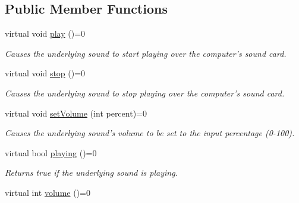 \subsection*{Public Member Functions}
\begin{DoxyCompactItemize}
\item 
\hypertarget{class_picto_1_1_preloaded_sound_a22fb576f20b369d32f1c6b42d7d00f79}{virtual void \hyperlink{class_picto_1_1_preloaded_sound_a22fb576f20b369d32f1c6b42d7d00f79}{play} ()=0}\label{class_picto_1_1_preloaded_sound_a22fb576f20b369d32f1c6b42d7d00f79}

\begin{DoxyCompactList}\small\item\em Causes the underlying sound to start playing over the computer's sound card. \end{DoxyCompactList}\item 
\hypertarget{class_picto_1_1_preloaded_sound_a876b9dd3eb966656503493a59e80554f}{virtual void \hyperlink{class_picto_1_1_preloaded_sound_a876b9dd3eb966656503493a59e80554f}{stop} ()=0}\label{class_picto_1_1_preloaded_sound_a876b9dd3eb966656503493a59e80554f}

\begin{DoxyCompactList}\small\item\em Causes the underlying sound to stop playing over the computer's sound card. \end{DoxyCompactList}\item 
\hypertarget{class_picto_1_1_preloaded_sound_abd5f14d441d6063b1ea2bd141e4023bc}{virtual void \hyperlink{class_picto_1_1_preloaded_sound_abd5f14d441d6063b1ea2bd141e4023bc}{set\-Volume} (int percent)=0}\label{class_picto_1_1_preloaded_sound_abd5f14d441d6063b1ea2bd141e4023bc}

\begin{DoxyCompactList}\small\item\em Causes the underlying sound's volume to be set to the input percentage (0-\/100). \end{DoxyCompactList}\item 
\hypertarget{class_picto_1_1_preloaded_sound_a741746e30058d944ab64a1614ea1906f}{virtual bool \hyperlink{class_picto_1_1_preloaded_sound_a741746e30058d944ab64a1614ea1906f}{playing} ()=0}\label{class_picto_1_1_preloaded_sound_a741746e30058d944ab64a1614ea1906f}

\begin{DoxyCompactList}\small\item\em Returns true if the underlying sound is playing. \end{DoxyCompactList}\item 
\hypertarget{class_picto_1_1_preloaded_sound_a6383e1a60e25b51815d1876b1b29a899}{virtual int \hyperlink{class_picto_1_1_preloaded_sound_a6383e1a60e25b51815d1876b1b29a899}{volume} ()=0}\label{class_picto_1_1_preloaded_sound_a6383e1a60e25b51815d1876b1b29a899}


\end{DoxyCompactItemize}
